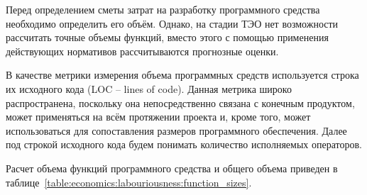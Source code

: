 Перед определением сметы затрат на разработку программного средства необходимо определить его объём. Однако, на стадии ТЭО нет возможности рассчитать точные объемы функций, вместо этого с помощью применения действующих нормативов рассчитываются прогнозные оценки.

В качестве метрики измерения объема программных средств используется строка их исходного кода (LOC -- lines of code). Данная метрика широко распространена, поскольку она непосредственно связана с конечным продуктом, может применяться на всём протяжении проекта и, кроме того, может использоваться для сопоставления размеров программного обеспечения. Далее под строкой исходного кода будем понимать количество исполняемых операторов.

Расчет объема функций программного средства и общего объема приведен в таблице~\ref{table:economics:labouriousness:function_sizes}.

